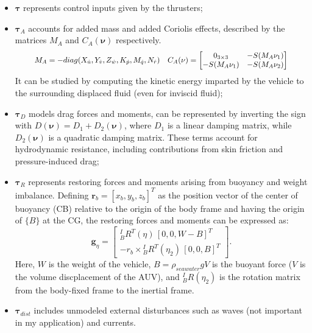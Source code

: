 \begin{itemize}
    \item $\mathbf{\tau}$ represents control inputs given by the thrusters;
    \item $\mathbf{\tau}_{A}$ accounts for added mass and added Coriolis effects, described by the matrices $M_A$ and $C_A(\mathbf{\nu})$ respectively. 
    \begin{equation}
        \scalebox{0.9}{
            $ M_A = -diag(X_{\dot{u}}, Y_{\dot{v}}, Z_{\dot{w}}, K_{\dot{p}}, M_{\dot{q}}, N_{\dot{r}}) \quad
            C_A(\mathbf{\nu}) = \begin{bmatrix}
            0_{3 \times 3} & -S(M_A\mathbf{\nu}_1) \\
            -S(M_A\mathbf{\nu}_1) & -S(M_A\mathbf{\nu}_2)
            \end{bmatrix} $
        }
        \label{eq:added_mass}
    \end{equation}
    It can be studied by computing the kinetic energy imparted by the vehicle to the surrounding displaced fluid (even for inviscid fluid);
    \item $\mathbf{\tau}_{D}$ models drag forces and moments, can be represented by inverting the sign with 
    $D(\mathbf{\nu}) = D_1 + D_2(\mathbf{\nu})$, where $D_1$ is a linear damping matrix, while $D_2(\mathbf{\nu})$ is a quadratic damping matrix. 
    These terms account for hydrodynamic resistance, including contributions from skin friction and pressure-induced drag;
    \item $\mathbf{\tau}_{R}$ represents restoring forces and moments arising from buoyancy and weight imbalance. Defining $\mathbf{r}_b = [x_b, y_b, z_b]^T$ as the 
    position vector of the center of buoyancy (CB) relative to the origin of the body frame and having the origin of $\{B\}$ at the CG,
    the restoring forces and moments can be expressed as:
    \begin{equation}
        \mathbf{g}_{\eta} = \begin{bmatrix}
            {}^I_B R^T(\eta)\,[0,0,W-B]^T\\
            - r_b\times {}^I_B R^T(\eta_2)\,[0,0,B]^T
        \end{bmatrix}.
        \label{eq:restoring_forces}
    \end{equation}
    Here, $W$ is the weight of the vehicle, $B = \rho_{seawater} g V$ is the buoyant force ($V$ is the volume discplacement of the AUV), and ${}^I_B R(\eta_2)$ is the rotation matrix from the body-fixed frame to the inertial frame.
    \item $\mathbf{\tau}_{dist}$ includes unmodeled external disturbances such as waves (not important in my application) and currents.
\end{itemize}
